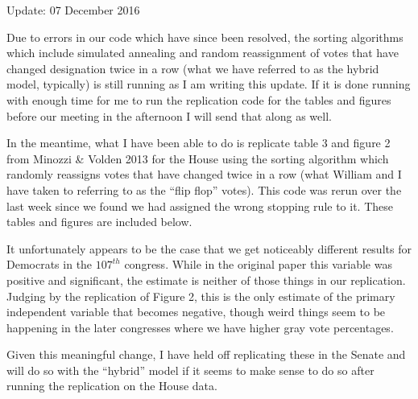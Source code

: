 \documentclass[12pt]{article}
\begin{document}
	
	\begin{center}
		Update: 07 December 2016
	\end{center}

Due to errors in our code which have since been resolved, the sorting algorithms which include simulated annealing and random reassignment of votes that have changed designation twice in a row (what we have referred to as the hybrid model, typically) is still running as I am writing this update. If it is done running with enough time for me to run the replication code for the tables and figures before our meeting in the afternoon I will send that along as well.

In the meantime, what I have been able to do is replicate table 3 and figure 2 from Minozzi \& Volden 2013 for the House using the sorting algorithm which randomly reassigns votes that have changed twice in a row (what William and I have taken to referring to as the ``flip flop'' votes). This code was rerun over the last week since we found we had assigned the wrong stopping rule to it. These tables and figures are included below.

It unfortunately appears to be the case that we get noticeably different results for Democrats in the $107^{th}$ congress. While in the original paper this variable was positive and significant, the estimate is neither of those things in our replication. Judging by the replication of Figure 2, this is the only estimate of the primary independent variable that becomes negative, though weird things seem to be happening in the later congresses where we have higher gray vote percentages.

Given this meaningful change, I have held off replicating these in the Senate and will do so with the ``hybrid'' model if it seems to make sense to do so after running the replication on the House data.
	
\end{document}
